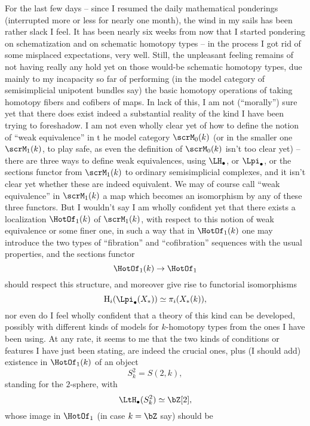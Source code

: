 \label{sec:123}%
For the last few days -- since I resumed the daily mathematical
ponderings (interrupted more or less for nearly one month), the wind
in my sails has been rather slack I feel. It has been nearly six weeks
from now that I started pondering on schematization and on schematic
homotopy types -- in the process I got rid of some misplaced
expectations, very well. Still, the unpleasant feeling remains of not
having really any hold yet on those would-be schematic homotopy types,
due mainly to my incapacity so far of performing (in the model
category of semisimplicial unipotent bundles say) the basic homotopy
operations of taking homotopy fibers and cofibers of maps. In lack of
this, I am not (``morally'') sure yet that there does exist indeed a
substantial reality of the kind I have been trying to foreshadow. I am
not even wholly clear yet of how to define the notion of ``weak
equivalence'' in t he model category $\scrM_0(k)$ (or in the smaller
one $\scrM_1(k)$, to play safe, as even the definition of $\scrM_0(k)$
isn't too clear yet) -- there are three ways to define weak
equivalences, using $\LH_\bullet$, or $\Lpi_\bullet$, or the sections
functor from $\scrM_1(k)$ to ordinary semisimplicial complexes, and it
isn't clear yet whether these are indeed equivalent. We may of course
call ``weak equivalence'' in $\scrM_1(k)$ a map which becomes an
isomorphism by any of these three functors. But I wouldn't say I am
wholly confident yet that there exists a localization $\HotOf_1(k)$ of
$\scrM_1(k)$, with respect to this notion of weak equivalence or some
finer one, in such a way that in $\HotOf_1(k)$ one may introduce the
two types of ``fibration'' and ``cofibration'' sequences with the
usual properties, and the sections functor
\[\HotOf_1(k)\to\HotOf_1\]
should respect this structure, and moreover give rise to functorial
isomorphisms
\[\mathrm H_i(\Lpi_\bullet(X_*)) \simeq \pi_i(X_*(k)),\]
nor even do I feel wholly confident that a theory of this kind can be
developed, possibly with different kinds of models for $k$-homotopy
types from the ones I have been using. At any rate, it seems to me
that the two kinds of conditions or features I have just been stating,
are indeed the crucial ones, plus (I should add) existence in
$\HotOf_1(k)$ of an object
\[S^2_k = S(2,k),\]
standing for the $2$-sphere, with
\[\LtH_\bullet(S^2_k) \simeq \bZ[2],\]
whose image in $\HotOf_1$ (in case $k=\bZ$ say) should be
